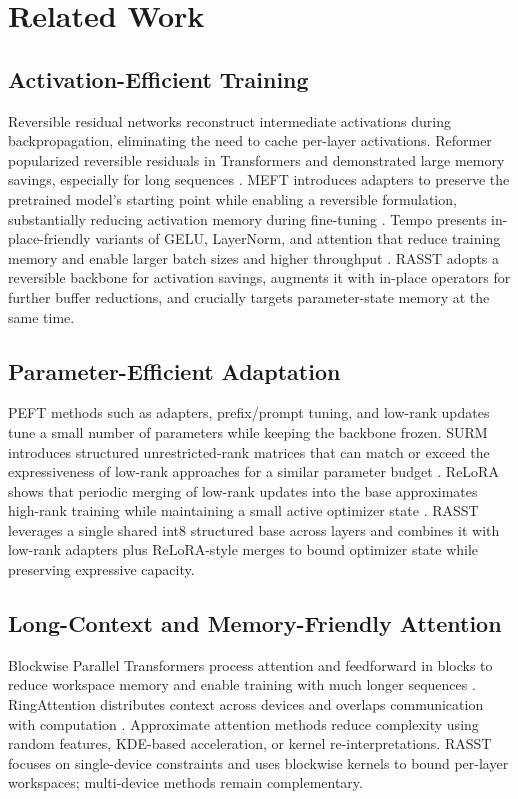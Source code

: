 \documentclass{article}
\begin{document}
\section{Related Work}
\subsection{Activation-Efficient Training}
Reversible residual networks reconstruct intermediate activations during backpropagation, eliminating the need to cache per-layer activations. Reformer popularized reversible residuals in Transformers and demonstrated large memory savings, especially for long sequences \cite{kitaev-2020-reformer}. MEFT introduces adapters to preserve the pretrained model's starting point while enabling a reversible formulation, substantially reducing activation memory during fine-tuning \cite{liao-2023-make}. Tempo presents in-place-friendly variants of GELU, LayerNorm, and attention that reduce training memory and enable larger batch sizes and higher throughput \cite{andoorveedu-2022-tempo}. RASST adopts a reversible backbone for activation savings, augments it with in-place operators for further buffer reductions, and crucially targets parameter-state memory at the same time.

\subsection{Parameter-Efficient Adaptation}
PEFT methods such as adapters, prefix/prompt tuning, and low-rank updates tune a small number of parameters while keeping the backbone frozen. SURM introduces structured unrestricted-rank matrices that can match or exceed the expressiveness of low-rank approaches for a similar parameter budget \cite{sehanobish-2024-structured}. ReLoRA shows that periodic merging of low-rank updates into the base approximates high-rank training while maintaining a small active optimizer state \cite{lialin-2023-relora}. RASST leverages a single shared int8 structured base across layers and combines it with low-rank adapters plus ReLoRA-style merges to bound optimizer state while preserving expressive capacity.

\subsection{Long-Context and Memory-Friendly Attention}
Blockwise Parallel Transformers process attention and feedforward in blocks to reduce workspace memory and enable training with much longer sequences \cite{liu-2023-blockwise}. RingAttention distributes context across devices and overlaps communication with computation \cite{liu-2023-ringattention}. Approximate attention methods reduce complexity using random features, KDE-based acceleration, or kernel re-interpretations. RASST focuses on single-device constraints and uses blockwise kernels to bound per-layer workspaces; multi-device methods remain complementary.
\end{document}
